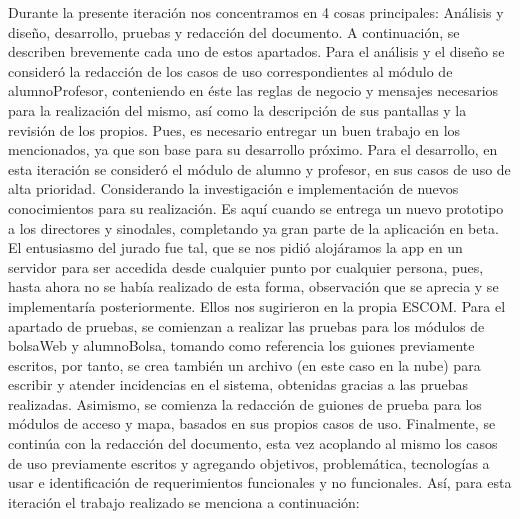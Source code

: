 \noindent
Durante la presente iteración nos concentramos en 4 cosas principales: Análisis y diseño, desarrollo, pruebas y redacción del documento. A continuación, se describen brevemente cada uno de estos apartados.
\newline
\newline
Para el análisis y el diseño se consideró la redacción de los casos de uso correspondientes al módulo de alumnoProfesor, conteniendo en éste las reglas de negocio y mensajes necesarios para la realización del mismo, así como la descripción de sus pantallas y la revisión de los propios. Pues, es necesario entregar un buen trabajo en los mencionados, ya que son base para su desarrollo próximo.
\newline
\newline
Para el desarrollo, en esta iteración se consideró el módulo de alumno y profesor, en sus casos de uso de alta prioridad. Considerando la investigación e implementación de nuevos conocimientos para su realización. Es aquí cuando se entrega un nuevo prototipo a los directores y sinodales, completando ya gran parte de la aplicación en beta. El entusiasmo del jurado fue tal, que se nos pidió alojáramos la app en un servidor para ser accedida desde cualquier punto por cualquier persona, pues, hasta ahora no se había realizado de esta forma, observación que se aprecia y se implementaría posteriormente. Ellos nos sugirieron en la propia ESCOM.
\newline
\newline
Para el apartado de pruebas, se comienzan a realizar las pruebas para los módulos de bolsaWeb y alumnoBolsa, tomando como referencia los guiones previamente escritos, por tanto, se crea también un archivo (en este caso en la nube) para escribir y atender incidencias en el sistema, obtenidas gracias a las pruebas realizadas. 
\newline
Asimismo, se comienza la redacción de guiones de prueba para los módulos de acceso y mapa, basados en sus propios casos de uso. 
\newline
\newline
Finalmente, se continúa con la redacción del documento, esta vez acoplando al mismo los casos de uso previamente escritos y agregando objetivos, problemática, tecnologías a usar e identificación de requerimientos funcionales y no funcionales.
\newline
Así, para esta iteración el trabajo realizado se menciona a continuación:
